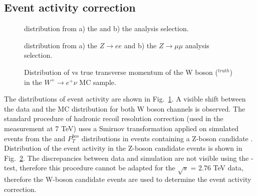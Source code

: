 \subsection{Event activity correction}\label{sec:SumetCor}



\begin{figure}[!tbp]
\begin{minipage}[h]{0.49\linewidth}
\end{minipage}
\hfill
\begin{minipage}[h]{0.49\linewidth}
\end{minipage}
\caption{\sumet distribution from a) the \wenu and b) the \wmunu analysis selection.}
\label{HadrRecoil:UncorrSumet}
\end{figure}

\begin{figure}[!tbp]
\begin{minipage}[h]{0.49\linewidth}
\end{minipage}
\hfill
\begin{minipage}[h]{0.49\linewidth}
\end{minipage}
\caption{\sumet distribution from a) the $Z\to ee$  and b) the $Z\to \mu\mu$ analysis selection.}
\label{HadronRecoilSumetZ}
\end{figure}

\begin{figure}[!tb]
\caption{Distribution of \sumet vs true transverse momentum of the W boson (\ptw$^{truth}$) in the $W^{+} \to e^{+}\nu$ MC sample.  }
\label{HadrRecoil:SumetPt}
\end{figure}




The distributions of event activity are shown in Fig.~\ref{HadrRecoil:UncorrSumet}. A visible shift between the data and the MC distribution for both W boson channels is observed. The standard procedure of hadronic recoil resolution correction (used in the \mtw measurement at 7 TeV) uses a Smirnov transformation applied on simulated events from the \sumet and $P_{T}^{bos}$ distributions in events containing a Z-boson candidate \cite{HRCorrections}. Distribution of the event activity in the Z-boson candidate events is shown in Fig.~\ref{HadronRecoilSumetZ}. The discrepancies between data and simulation are not visible using the \chiD-test, therefore this procedure cannot be adapted for the $\sqrt{s}$ = 2.76 TeV data, therefore the W-boson candidate events are used to determine the event activity correction.

